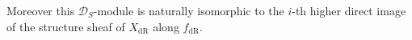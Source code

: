 \documentclass{article}
\theoremstyle{definition}
\theoremstyle{remark}
\newcommand{\scr}[1]{\mathscr{#1}}
\DeclareMathOperator{\dr}{dR}
\begin{document}
Moreover this $\scr{D}_S$-module is naturally isomorphic to the $i$-th higher direct image of the structure sheaf of $X_{\dr}$ along $f_{\dr}$.


\bigskip

\nocite{*}


{\small }

\end{document}
